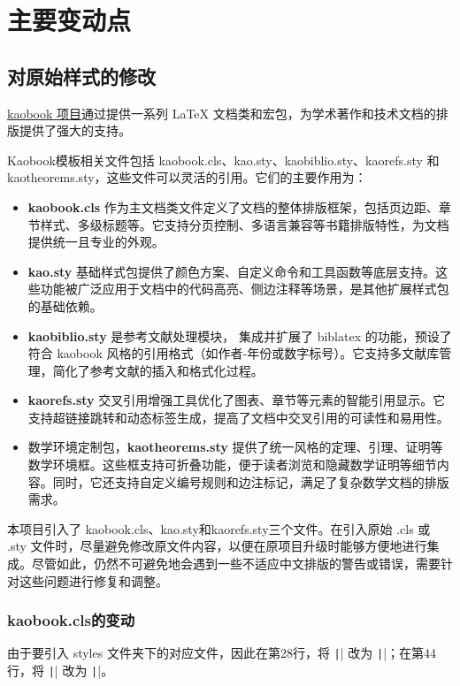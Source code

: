 \setchapterpreamble[u]{\margintoc}
\chapter{主要变动点}

\section[原样式修改]{对原始样式的修改}

\href{https://github.com/fmarotta/kaobook}{kaobook 项目}通过提供一系列 LaTeX 文档类和宏包，为学术著作和技术文档的排版提供了强大的支持。

Kaobook模板相关文件包括 kaobook.cls、kao.sty、kaobiblio.sty、kaorefs.sty 和 kaotheorems.sty，这些文件可以灵活的引用。它们的主要作用为：

\begin{itemize}
    \item \textbf{kaobook.cls‌} 作为主文档类文件定义了文档的整体排版框架，包括页边距、章节样式、多级标题等。它支持分页控制、多语言兼容等书籍排版特性，为文档提供统一且专业的外观。
    \item \textbf{kao.sty} 基础样式包提供了颜色方案、自定义命令和工具函数等底层支持。这些功能被广泛应用于文档中的代码高亮、侧边注释等场景，是其他扩展样式包的基础依赖。
    \item \textbf{kaobiblio.sty} 是参考文献处理模块， 集成并扩展了 biblatex 的功能，预设了符合 kaobook 风格的引用格式（如作者-年份或数字标号）。它支持多文献库管理，简化了参考文献的插入和格式化过程。
    \item \textbf{kaorefs.sty} 交叉引用增强工具优化了图表、章节等元素的智能引用显示。它支持超链接跳转和动态标签生成，提高了文档中交叉引用的可读性和易用性。
    \item 数学环境定制包，\textbf{kaotheorems.sty} 提供了统一风格的定理、引理、证明等数学环境框。这些框支持可折叠功能，便于读者浏览和隐藏数学证明等细节内容。同时，它还支持自定义编号规则和边注标记，满足了复杂数学文档的排版需求。
\end{itemize}

本项目引入了 kaobook.cls、kao.sty和kaorefs.sty三个文件。在引入原始 .cls 或 .sty 文件时，尽量避免修改原文件内容，以便在原项目升级时能够方便地进行集成。尽管如此，仍然不可避免地会遇到一些不适应中文排版的警告或错误，需要针对这些问题进行修复和调整。


\subsection{kaobook.cls‌的变动}
由于要引入 styles 文件夹下的对应文件，因此在第28行，将 \texttt|| 改为 \texttt||；在第44行，将 \texttt|\RequirePackage{kao}| 改为 \texttt|\RequirePackage{styles/kao}|。

